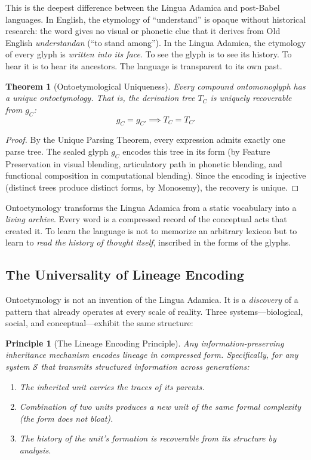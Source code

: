\documentclass[12pt, letterpaper]{book}
\def\equiv{=}%
\def\mathfrak#1{#1}%
\newtheorem{theorem}{Theorem}[chapter]
\newtheorem{principle}{Principle}[chapter]
\begin{document}
This is the deepest difference between the Lingua Adamica and post-Babel languages. In English, the etymology of ``understand'' is opaque without historical research: the word gives no visual or phonetic clue that it derives from Old English \textit{understandan} (``to stand among''). In the Lingua Adamica, the etymology of every glyph is \textit{written into its face}. To see the glyph is to see its history. To hear it is to hear its ancestors. The language is transparent to its own past.

\begin{theorem}[Ontoetymological Uniqueness]\label{thm:etymology}
Every compound ontomonoglyph has a unique ontoetymology. That is, the derivation tree $T_C$ is uniquely recoverable from $\mathfrak{g}_C$:
\[
\mathfrak{g}_C \equiv \mathfrak{g}_{C'} \implies T_C \equiv T_{C'}
\]
\end{theorem}

\begin{proof}
By the Unique Parsing Theorem, every expression admits exactly one parse tree. The sealed glyph $\mathfrak{g}_C$ encodes this tree in its form (by Feature Preservation in visual blending, articulatory path in phonetic blending, and functional composition in computational blending). Since the encoding is injective (distinct trees produce distinct forms, by Monosemy), the recovery is unique.
\end{proof}

Ontoetymology transforms the Lingua Adamica from a static vocabulary into a \textit{living archive}. Every word is a compressed record of the conceptual acts that created it. To learn the language is not to memorize an arbitrary lexicon but to learn to \textit{read the history of thought itself}, inscribed in the forms of the glyphs.

\subsection{The Universality of Lineage Encoding}

Ontoetymology is not an invention of the Lingua Adamica. It is a \textit{discovery} of a pattern that already operates at every scale of reality. Three systems---biological, social, and conceptual---exhibit the same structure:

\begin{principle}[The Lineage Encoding Principle]\label{pr:lineage}
Any information-preserving inheritance mechanism encodes lineage in compressed form. Specifically, for any system $\mathcal{S}$ that transmits structured information across generations:
\begin{enumerate}[label=(\roman*)]
    \item The inherited unit carries the traces of its parents.
    \item Combination of two units produces a new unit of the same formal complexity (the form does not bloat).
    \item The history of the unit's formation is recoverable from its structure by analysis.
\end{enumerate}
\end{principle}
\end{document}
